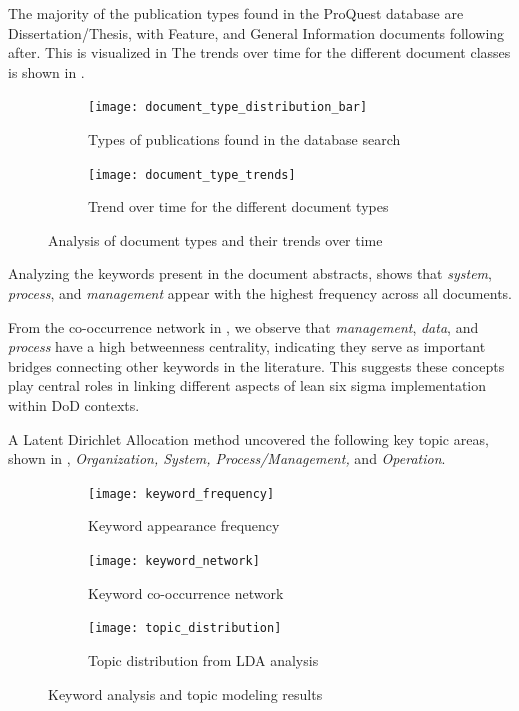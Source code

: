 \documentclass{article}
\begin{document}
	The majority of the publication types found in the ProQuest database are Dissertation/Thesis, with Feature, and General Information documents following after.
	This is visualized in 
	The trends over time for the different document classes is shown in .

	\begin{figure}[htbp]
		\centering
		\begin{subfigure}[b]{0.48\textwidth}
			\centering
			\texttt{[image: document\_type\_distribution\_bar]}
			\caption{Types of publications found in the database search}
			\label{fig:document_type}
		\end{subfigure}
		\hfill
		\begin{subfigure}[b]{0.48\textwidth}
			\centering
			\texttt{[image: document\_type\_trends]}
			\caption{Trend over time for the different document types}
			\label{fig:document_type_trend}
		\end{subfigure}
		\caption{Analysis of document types and their trends over time}
		\label{fig:document_analysis}
	\end{figure}


	Analyzing the keywords present in the document abstracts,  shows that \textit{system}, \textit{process}, and \textit{management} appear with the highest frequency across all documents.

	From the co-occurrence network in , we observe that \textit{management}, \textit{data}, and \textit{process} have a high betweenness centrality, indicating they serve as important bridges connecting other keywords in the literature. This suggests these concepts play central roles in linking different aspects of lean six sigma implementation within DoD contexts.

	A Latent Dirichlet Allocation method uncovered the following key topic areas, shown in , \textit{Organization, System, Process/Management,} and \textit{Operation}.

	\begin{figure}[htbp]
		\centering
		\begin{subfigure}[b]{0.32\textwidth}
			\centering
			\texttt{[image: keyword\_frequency]}
			\caption{Keyword appearance frequency}
			\label{fig:keyword_freq}
		\end{subfigure}
		\hfill
		\begin{subfigure}[b]{0.32\textwidth}
			\centering
			\texttt{[image: keyword\_network]}
			\caption{Keyword co-occurrence network}
			\label{fig:keyword_network}
		\end{subfigure}
		\hfill
		\begin{subfigure}[b]{0.32\textwidth}
			\centering
			\texttt{[image: topic\_distribution]}
			\caption{Topic distribution from LDA analysis}
			\label{fig:topics}
		\end{subfigure}
		\caption{Keyword analysis and topic modeling results}
		\label{fig:keyword_analysis}
	\end{figure}
\end{document}
